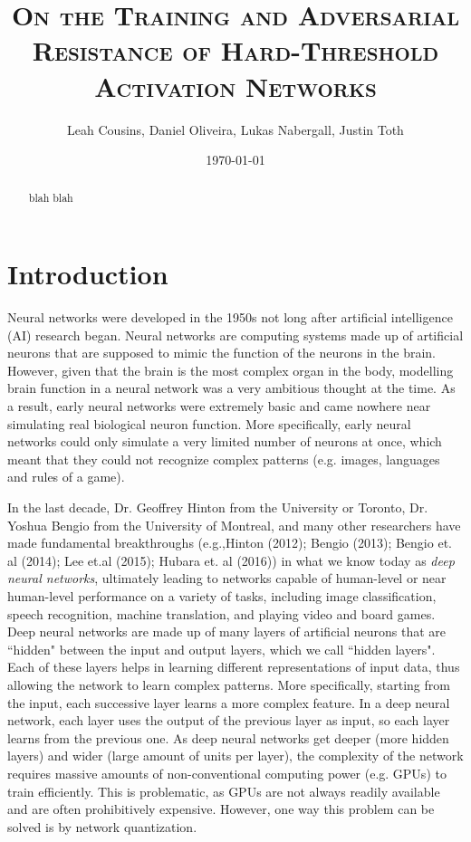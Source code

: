 \documentclass[a4paper]{article}
\title{\scshape On the Training and Adversarial Resistance
of Hard-Threshold Activation Networks}
\author{Leah Cousins, Daniel Oliveira, Lukas Nabergall, Justin Toth}
\date{\today}
\begin{document}
\maketitle

\begin{abstract}
blah blah
\end{abstract}


\section{Introduction}
\label{S:1}

Neural networks were developed in the 1950s not long after artificial intelligence (AI) research began. Neural networks are computing systems made up of artificial neurons that are supposed to mimic the function of the neurons in the brain. However, given that the brain is the most complex organ in the body, modelling brain function in a neural network was a very ambitious thought at the time. As a result, early neural networks were extremely basic and came nowhere near simulating real biological neuron function. More specifically, early neural networks could only simulate a very limited number of neurons at once, which meant that they could not recognize complex patterns (e.g. images, languages and rules of a game). 
 
In the last decade, Dr. Geoffrey Hinton from the University or Toronto, Dr. Yoshua Bengio from the University of Montreal, and many other researchers have made fundamental breakthroughs (e.g.,Hinton (2012); Bengio (2013); Bengio et. al (2014); Lee et.al (2015); Hubara et. al (2016)) in what we know today as \textit{deep neural networks}, ultimately leading to networks capable of human-level or near human-level performance on a variety of tasks, including image classification, speech recognition, machine translation, and playing video and board games. \\

Deep neural networks are made up of many layers of artificial neurons that are ``hidden" between the input and output layers, which we call ``hidden layers". Each of these layers helps in learning different representations of input data, thus allowing the network to learn complex patterns. More specifically, starting from the input, each successive layer learns a more complex feature. In a deep neural network, each layer uses the output of the previous layer as input, so each layer learns from the previous one. As deep neural networks get deeper (more hidden layers) and wider (large amount of units per layer), the complexity of the network requires massive amounts of non-conventional computing power (e.g. GPUs) to train efficiently. This is problematic, as GPUs are not always readily available and are often prohibitively expensive. However, one way this problem can be solved is by network quantization. \\
\end{document}
